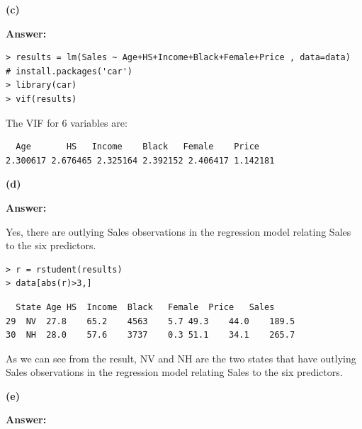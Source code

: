 \documentclass[letterpaper,11pt]{article}
\begin{document}
\begin{addmargin}[-1.1em]{0em}
  \textbf{(c)}\par
\end{addmargin}
\textbf{}\par
\bigbreak
\begin{addmargin}[-0.5em]{0em}
  \textbf{Answer: }
\end{addmargin}

\begin{lstlisting}
> results = lm(Sales ~ Age+HS+Income+Black+Female+Price , data=data)
# install.packages('car')
> library(car)
> vif(results)
\end{lstlisting}
The VIF for 6 variables are:
\begin{lstlisting}
  Age       HS   Income    Black   Female    Price
2.300617 2.676465 2.325164 2.392152 2.406417 1.142181
\end{lstlisting}

\begin{addmargin}[-1.1em]{0em}
  \textbf{(d)}\par
\end{addmargin}
\textbf{}\par
\bigbreak
\begin{addmargin}[-0.5em]{0em}
  \textbf{Answer: }
\end{addmargin}

Yes, there are outlying Sales observations in the regression model relating Sales to the six predictors.\par
\begin{lstlisting}
> r = rstudent(results)
> data[abs(r)>3,]
\end{lstlisting}

\begin{lstlisting}
  State	Age	HS	Income	Black	Female	Price	Sales
29	NV	27.8	65.2	4563	5.7	49.3	44.0	189.5
30	NH	28.0	57.6	3737	0.3	51.1	34.1	265.7
\end{lstlisting}

As we can see from the result, NV and NH are the two states that have outlying Sales observations in the regression model relating Sales to the six predictors.

\begin{addmargin}[-1.1em]{0em}
  \textbf{(e)}\par
\end{addmargin}
\textbf{}\par
\bigbreak
\begin{addmargin}[-0.5em]{0em}
  \textbf{Answer: }
\end{addmargin}
\end{document}
